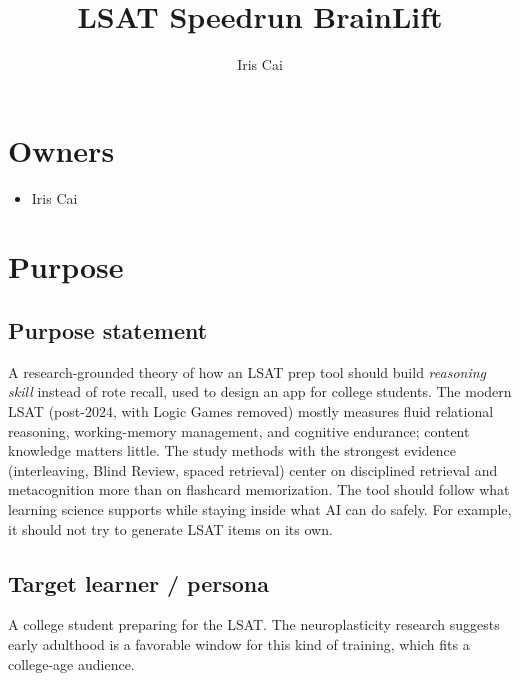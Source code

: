 \documentclass[11pt]{article}
\title{LSAT Speedrun BrainLift}
\author{Iris Cai}
\date{}
\begin{document}
\maketitle

\section*{Owners}
\begin{itemize}
\item Iris Cai
\end{itemize}

\section*{Purpose}

\subsection*{Purpose statement}
A research-grounded theory of how an LSAT prep tool should build \textit{reasoning skill} instead of rote recall, used to design an app for college students. The modern LSAT (post-2024, with Logic Games removed) mostly measures fluid relational reasoning, working-memory management, and cognitive endurance; content knowledge matters little. The study methods with the strongest evidence (interleaving, Blind Review, spaced retrieval) center on disciplined retrieval and metacognition more than on flashcard memorization. The tool should follow what learning science supports while staying inside what AI can do safely. For example, it should not try to generate LSAT items on its own.

\subsection*{Target learner / persona}
A college student preparing for the LSAT.
The neuroplasticity research suggests early adulthood is a favorable window for this kind of training, which fits a college-age audience.
\end{document}
